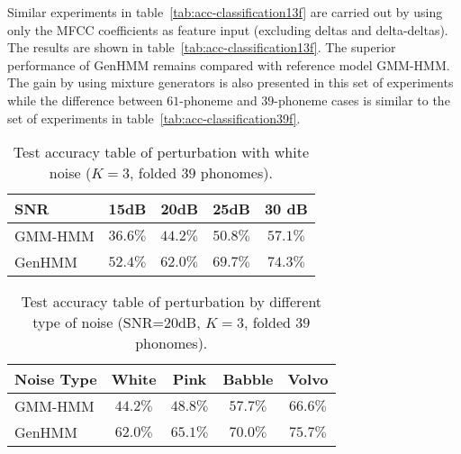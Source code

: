 \documentclass[letterpaper]{article} %
\begin{document}
Similar experiments in table~\ref{tab:acc-classification13f} are carried out by using only the MFCC coefficients as feature input (excluding deltas and delta-deltas). The results are shown in table~\ref{tab:acc-classification13f}. The superior performance of GenHMM remains compared with reference model GMM-HMM. The gain by using mixture generators is also presented in this set of experiments while the difference between $61$-phoneme and $39$-phoneme cases is similar to the set of experiments in table~\ref{tab:acc-classification39f}.

\begin{table}
  \caption{Test accuracy table of perturbation with white noise ($K=3$, folded $39$ phonomes).}
  \label{tab:acc-classification39f_noise_snr}
  \vspace{-0.1cm}
  \centering
  \begin{tabular}{l|c|c|c|c}
    \toprule
    {SNR} &  15dB &  20dB &  25dB & 30 dB  \\  \midrule
    GMM-HMM & $36.6\%$ &  $44.2\%$ &  $50.8\%$ & $57.1\%$  \\ \midrule
    GenHMM & $52.4\%$ & $62.0\%$ &  $69.7\%$ & $74.3\%$ \\ 
    \bottomrule                                                                  
  \end{tabular}
  \vspace{0.3cm}
\end{table}
\begin{table}
  \caption{Test accuracy table of perturbation by different type of noise (SNR=$20$dB, $K=3$, folded $39$ phonomes).}
  \label{tab:acc-classification39f_noise_type}
  \vspace{-0.1cm}
  \centering
  \begin{tabular}{l|c|c|c|c}
    \toprule
    {Noise Type} &  White &  Pink &  Babble & Volvo  \\  \midrule
    GMM-HMM & $44.2\%$ &  $48.8\%$ &  $57.7\%$ & $66.6\%$  \\ \midrule
    GenHMM & $62.0\%$ & $65.1\%$ &  $70.0\%$ & $75.7\%$ \\ 
    \bottomrule                                                                  
  \end{tabular}
  \vspace{0.3cm}
\end{table}
\end{document}
